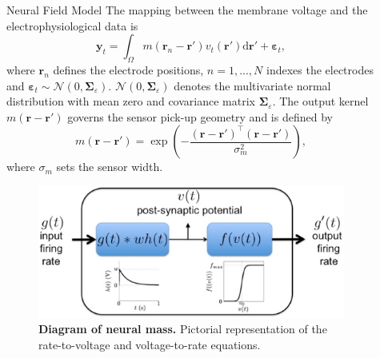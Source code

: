 \documentclass[final]{beamer}
\newlength{\sepwid}
\newlength{\onecolwid}
\begin{document}
\begin{frame}[t]
\begin{columns}[t]
\begin{column}{\onecolwid}
\begin{block}{Neural Field Model}
{The mapping between the membrane voltage and the electrophysiological data is
	\begin{equation}
	    \label{eq:ObservationEquation}
		\mathbf{y}_t =
		\int_{\Omega}{
		    m\left(\mathbf{r}_n-\mathbf{r}'\right)v_t\left(\mathbf{r}'\right)
		\textrm{d}\mathbf{r}'} + 
		\boldsymbol{\varepsilon}_t, 
	\end{equation}
	where $\mathbf{r}_n$ defines the electrode positions, $n=1,...,N$ indexes the electrodes and $\boldsymbol{\varepsilon}_t \sim \mathcal{N}\left(0,\boldsymbol{\Sigma}_{\varepsilon}\right)$. $\mathcal{N}\left(0,\boldsymbol{\Sigma}_{\varepsilon}\right)$ denotes the multivariate normal distribution with mean zero and covariance matrix $\boldsymbol{\Sigma}_{\varepsilon}$. The output kernel $m(\mathbf{r}-\mathbf{r}')$ governs the sensor pick-up geometry and is defined by 
	\begin{equation}
		m\left(\mathbf{r}-\mathbf{r}'\right) = \exp{\left(-\frac{(\mathbf{r}-\mathbf{r}')^\top(\mathbf{r}-\mathbf{r}')}{\sigma_m^2}\right)},
	\end{equation}
	where $\sigma_m$ sets the sensor width.}
    \end{block}

	\begin{figure}
	\begin{center}
	\includegraphics[width=8in, scale = 10]{FieldModel.eps}
	\end{center}
	\caption{{\bf Diagram of neural mass.} Pictorial representation of the rate-to-voltage and voltage-to-rate equations.} 
	\label{fig:Figure1}
	\end{figure}
	
    \end{column}

    \begin{column}{\sepwid}\end{column}			%
	
    \begin{column}{\onecolwid}					  
      


\end{column}
\end{columns}
\end{frame}
\end{document}
